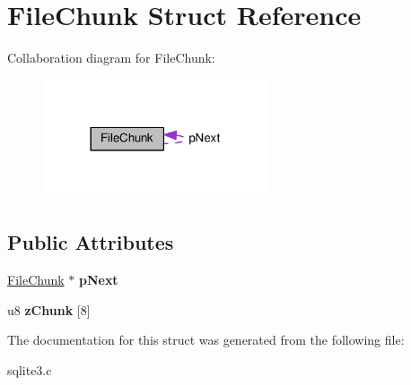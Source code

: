 \hypertarget{structFileChunk}{}\section{File\+Chunk Struct Reference}
\label{structFileChunk}


Collaboration diagram for File\+Chunk\+:\nopagebreak
\begin{figure}[H]
\begin{center}
\leavevmode
\includegraphics[width=189pt]{structFileChunk__coll__graph}
\end{center}
\end{figure}
\subsection*{Public Attributes}
\begin{DoxyCompactItemize}
\item 
\hyperlink{structFileChunk}{File\+Chunk} $\ast$ {\bfseries p\+Next}\hypertarget{structFileChunk_ad2d0d170afc7ce1e239e8716852e247b}{}\label{structFileChunk_ad2d0d170afc7ce1e239e8716852e247b}

\item 
u8 {\bfseries z\+Chunk} \mbox{[}8\mbox{]}\hypertarget{structFileChunk_a1e7a92812b21bba27661fb38a5f597a7}{}\label{structFileChunk_a1e7a92812b21bba27661fb38a5f597a7}

\end{DoxyCompactItemize}


The documentation for this struct was generated from the following file\+:\begin{DoxyCompactItemize}
\item 
sqlite3.\+c\end{DoxyCompactItemize}
